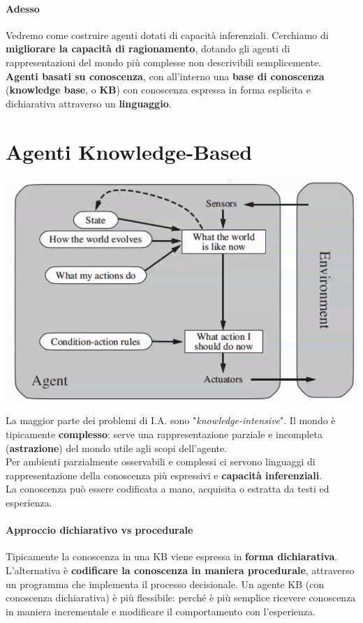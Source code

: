 \documentclass[10pt]{book}
\begin{document}
\paragraph{Adesso} Vedremo come costruire agenti dotati di capacità inferenziali. Cerchiamo di \textbf{migliorare la capacità di ragionamento}, dotando gli agenti di rappresentazioni del mondo più complesse non descrivibili semplicemente.\\
\textbf{Agenti basati su conoscenza}, con all'interno una \textbf{base di conoscenza} (\textbf{knowledge base}, o \textbf{KB}) con conoscenza espressa in forma esplicita e dichiarativa attraverso un \textbf{linguaggio}.
\section{Agenti Knowledge-Based}
\begin{center}
	\includegraphics[scale=0.7]{ag_conosc.png}
\end{center}
La maggior parte dei problemi di I.A. sono "\textit{knowledge-intensive}". Il mondo è tipicamente \textbf{complesso}: serve una rappresentazione parziale e incompleta (\textbf{astrazione}) del mondo utile agli scopi dell'agente.\\
Per ambienti parzialmente osservabili e complessi ci servono linguaggi di rappresentazione della conoscenza più espressivi e \textbf{capacità inferenziali}.\\
La conoscenza può essere codificata a mano, acquisita o estratta da testi ed esperienza.
\pagebreak
\paragraph{Approccio dichiarativo vs procedurale}
Tipicamente la conoscenza in una KB viene espressa in \textbf{forma dichiarativa}. L'alternativa è \textbf{codificare la conoscenza in maniera procedurale}, attraverso un programma che implementa il processo decisionale. Un agente KB (con conoscenza dichiarativa) è più flessibile: perché è più semplice ricevere conoscenza in maniera incrementale e modificare il comportamento con l'esperienza.
\end{document}
